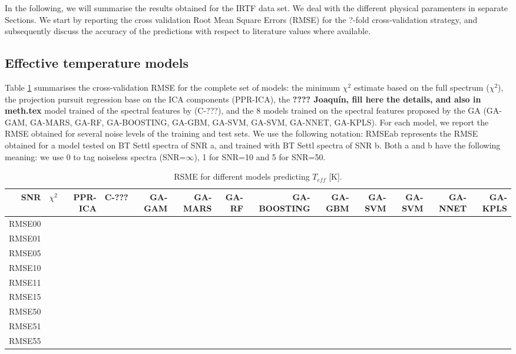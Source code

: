 
In the following, we will summarise the results obtained for the IRTF
data set. We deal with the different physical paramenters in separate
Sections. We start by reporting the cross validation Root Mean Square
Errors (RMSE) for the ?-fold cross-validation strategy, and
subsequently discuss the accuracy of the predictions with respect to
literature values where available.

\subsection{Effective temperature models}

Table \ref{tab:model_TSD} summarises the cross-validation RMSE for the
complete set of models: the minimum $\chi^2$ estimate based on the
full spectrum ($\chi^2$), the projection pursuit regression base on
the ICA components (PPR-ICA), the {\bf ???? Joaquín, fill here the
details, and also in meth.tex} model trained of the spectral features
by \cite{cesetti} (C-???), and the 8 models trained on the spectral
features proposed by the GA (GA-GAM, GA-MARS, GA-RF, GA-BOOSTING,
GA-GBM, GA-SVM, GA-SVM, GA-NNET, GA-KPLS). For each model, we report
the RMSE obtained for several noise levels of the training and test
sets. We use the following notation: RMSEab represents the RMSE
obtained for a model tested on BT Settl spectra of SNR a, and trained
with BT Settl spectra of SNR b. Both a and b have the following
meaning: we use 0 to tag noiseless spectra (SNR=$\infty$), 1 for
SNR=10 and 5 for SNR=50.

\begin{table}
\begin{center}
\begin{tabular}{rrrrrrrrrrrrr}
  \hline
  
  SNR & $\chi^2$ & PPR-ICA & C-??? & GA-GAM & GA-MARS & GA-RF &
GA-BOOSTING & GA-GBM & GA-SVM & GA-SVM & GA-NNET & GA-KPLS \\

\hline

RMSE00 & & & & & & & & & & & & \\
RMSE01 & & & & & & & & & & & & \\
RMSE05 & & & & & & & & & & & & \\
RMSE10 & & & & & & & & & & & & \\
RMSE11 & & & & & & & & & & & & \\
RMSE15 & & & & & & & & & & & & \\
RMSE50 & & & & & & & & & & & & \\
RMSE51 & & & & & & & & & & & & \\
RMSE55 & & & & & & & & & & & & \\

\hline
\end{tabular}
\caption { RSME for different models predicting $T_{eff}$ [K].} 
\label{tab:model_TSD} 
\end{center}
\end{table}


